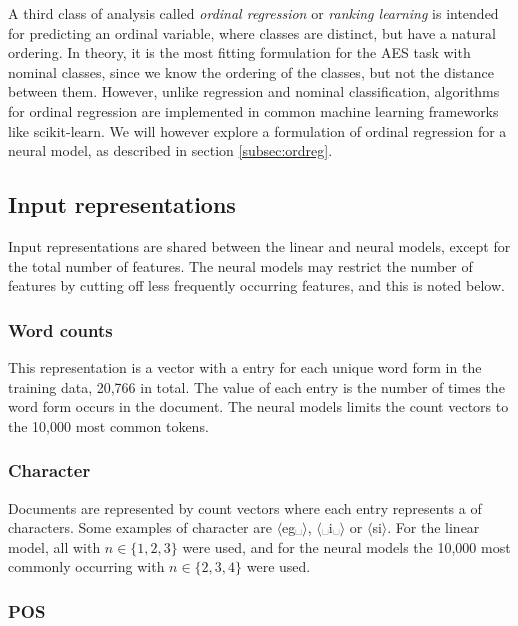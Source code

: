 A third class of analysis called \emph{ordinal regression} or \emph{ranking
learning} is intended for predicting an ordinal variable, where classes are
distinct, but have a natural ordering. In theory, it is the most fitting
formulation for the \ac{AES} task with nominal classes, since we know the
ordering of the classes, but not the distance between them. However, unlike
regression and nominal classification, algorithms for ordinal regression are
implemented in common machine learning frameworks like scikit-learn. We will
however explore a formulation of ordinal regression for a neural model, as
described in section \ref{subsec:ordreg}.


\subsection{Input representations}

Input representations are shared between the linear and neural models, except
for the total number of features. The neural models may restrict the number
of features by cutting off less frequently occurring features, and this is
noted below.

\subsubsection*{Word counts}

This representation is a vector with a entry for each unique word form in the
training data, 20,766 in total. The value of each entry is the number of
times the word form occurs in the document. The neural models limits the
count vectors to the 10,000 most common tokens.

\subsubsection*{Character \ngrams}

Documents are represented by count vectors where each entry represents a
\ngram of characters. Some examples of character \ngrams are
$\langle$eg␣$\rangle$, $\langle$␣i␣$\rangle$ or $\langle$si$\rangle$. For the
linear model, all \ngrams with $n\in \{1,2,3\}$ were used, and for the neural
models the 10,000 most commonly occurring \ngrams with $n\in \{2,3,4\}$ were
used.

\subsubsection*{POS \ngrams}

